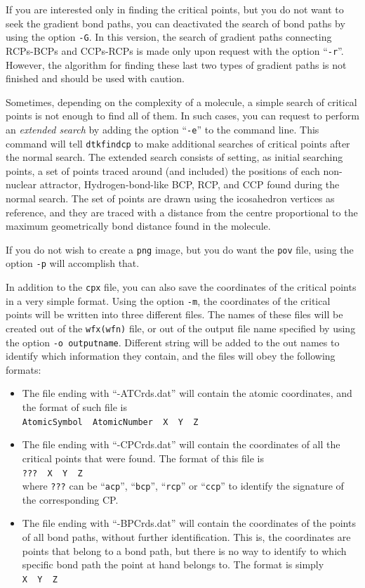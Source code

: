 If you are interested only in finding the critical points, but you do not want to seek the gradient bond paths, you can deactivated the search of bond paths by using the option \texttt{-G}. In this version, the search of gradient paths connecting RCPs-BCPs and CCPs-RCPs is made only upon request with the option ``\texttt{-r}''. However, the algorithm for finding these last two types of gradient paths is not finished and should be used with caution.

Sometimes, depending on the complexity of a molecule, a simple search of critical points is not enough to find all of them. In such cases, you can request to perform an \textit{extended search}
by adding the option ``\texttt{-e}'' to the command line. This command will tell \texttt{dtkfindcp}
to make additional searches of critical points after the normal search.
 The extended search consists of setting, as initial searching points,
a set of points traced around (and included) the positions of each non-nuclear
attractor, Hydrogen-bond-like BCP, RCP, and CCP found during the normal search. The set of points
are drawn using the icosahedron vertices as reference, and they are traced with a distance from
the centre proportional to the maximum geometrically bond distance found in the molecule.

If you do not wish to create a \texttt{png} image, but you do want the \texttt{pov} file, using the option \texttt{-p} will accomplish that.

In addition to the \texttt{cpx} file, you can also save the coordinates of the critical points in a very simple format. Using the option \texttt{-m}, the coordinates of the critical points will be written into three different files. The names of these files will be created out of the \texttt{wfx(wfn)} file, or out of the output file name specified by using the option \texttt{-o outputname}. Different string will be added to the out names to identify which information they contain, and the files will obey the following formats:
\begin{itemize}
   \item The file ending with ``-ATCrds.dat'' will contain the atomic coordinates, and the format of such file is\\
   \texttt{AtomicSymbol \ AtomicNumber \ X \ Y \ Z}
   \item The file ending with ``-CPCrds.dat'' will contain the coordinates of all the critical points that were found. The format of this file is\\
   \texttt{??? \ X \ Y \ Z}\\
   where \texttt{???} can be ``\texttt{acp}'', ``\texttt{bcp}'', ``\texttt{rcp}'' or ``\texttt{ccp}'' to identify the signature of the corresponding CP.
   \item The file ending with ``-BPCrds.dat'' will contain the coordinates of the points of all bond paths, without further identification. This is, the coordinates are points that belong to a bond path, but there is no way to identify to which specific bond path the point at hand belongs to. The format is simply\\
   \texttt{X \ Y \ Z}
\end{itemize}

